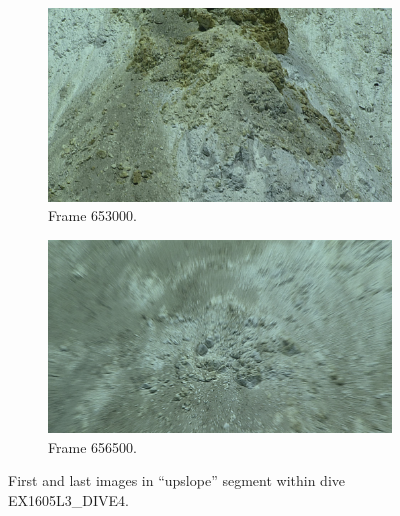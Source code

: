 \documentclass[letterpaper,12pt]{article}
\begin{document}
\begin{figure}[p]
    \centering
    \begin{subfigure}[b]{0.48\textwidth}
        \includegraphics[width=\textwidth]{images/image_653000.png}
        \caption{Frame 653000.}
        \label{fig:ex1605l3_dive4_upslope_begin}
    \end{subfigure}
    \begin{subfigure}[b]{0.48\textwidth}
        \includegraphics[width=\textwidth]{images/image_656500.png}
        \caption{Frame 656500.}
        \label{fig:ex1605l3_dive4_upslope_end}
    \end{subfigure}
    \caption{First and last images in ``upslope'' segment within dive EX1605L3\_DIVE4.}
\end{figure}
\end{document}
